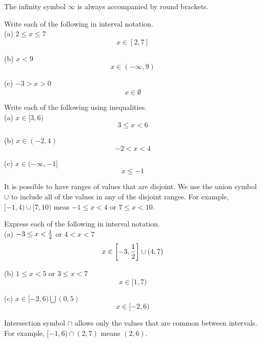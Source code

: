 The infinity symbol $ \infty $ is always accompanied by round brackets. \\

\begin{exercise}\nonumber
	Write each of the following in interval notation. \\

	(a) $ 2 \le x \le 7 $ \\
	$$
		x \in [2, 7]
	$$

	(b) $ x < 9 $ \\
	$$
		x \in (-\infty, 9)
	$$

	(c) $ -3 > x > 0 $ \\
	$$
		x \in \emptyset
	$$
\end{exercise}

\begin{exercise}\nonumber
	Write each of the following using inequalities. \\

	(a) $ x \in [3, 6) $ \\
				$$
					3 \le x < 6
				$$

				(b) $ x \in (-2, 4) $ \\
				$$
					-2 < x < 4
				$$

				(c) $ x \in (-\infty, -1] $ \\
	$$
		x \le -1
	$$
\end{exercise}

It is possible to have ranges of values that are disjoint. We use the union symbol $ \cup $ to include all of the values in any of the disjoint ranges. For example, $ [-1, 4) \cup [7, 10) $ meas $ -1 \le x < 4 $ or $ 7 \le x < 10 $. \\

\begin{exercise}\nonumber
	Express each of the following in interval notation. \\

	(a) $ -3 \le x < {1 \over 2} $ or $ 4 < x < 7 $ \\
	$$
		x \in \left[-3, {1 \over 2}\right] \cup (4, 7)
	$$

	(b) $ 1 \le x < 5 $ or $ 3 \le x < 7 $ \\
	$$
		x \in [1, 7)
	$$

	(c) $ x \in [-2, 6) \bigcup (0, 5) $ \\
	$$
		x \in [-2, 6)
	$$
\end{exercise}

Intersection symbol $ \cap $ allows only the values that are common between intervals. For example, $ [-1, 6) \cap (2, 7) $ means $ (2, 6) $. \\

